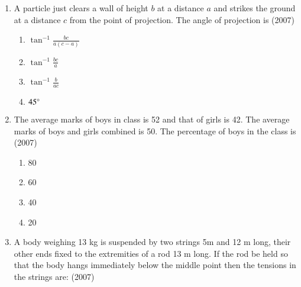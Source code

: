 \documentclass[journal]{IEEEtran}
\begin{document}
\begin{enumerate}
        \begin{multicols}{4}
            \begin{enumerate}
                \item $3n$
                \item $4n$ 
                \item $5n$
                \item $6n$ 
            \end{enumerate} 
        \end{multicols}

    \item A particle just clears a wall of height $b$ at a distance
        $a$ and strikes the ground at a distance $c$ from the point
        of projection. The angle of projection is
        \hfill (2007)

        \begin{multicols}{4}
            \begin{enumerate}
                \item $\tan^{-1} \frac {bc} {a(c - a)}$
                \item $\tan^{-1} \frac {bc} {a}$
                \item $\tan^{-1} \frac {b} {ac}$
                \item $45 \degree$
            \end{enumerate} 
        \end{multicols}

    \item The average marks of boys in class is 52 and that of girls
        is 42. The average marks of boys and girls combined is 50.
        The percentage of boys in the class is
        \hfill (2007)

        \begin{multicols}{4}
            \begin{enumerate}
                \item 80
                \item 60
                \item 40
                \item 20
            \end{enumerate} 
        \end{multicols}

    \item A body weighing 13 kg is suspended by two strings 5m and
        12 m long, their other ends fixed to the extremities of a
        rod 13 m long. If the rod be held so that the body hangs
        immediately below the middle point then the tensions in the
        strings are:
        \hfill (2007)


\end{enumerate}
\end{document}
